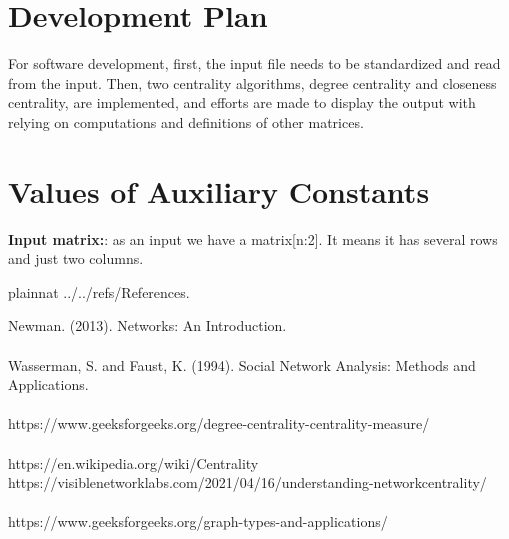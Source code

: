 \documentclass[12pt]{article}
\begin{document}



\section{Development Plan}


For software development, first, the input file needs to be standardized and read from the input. Then, two centrality algorithms, degree centrality and closeness centrality, are implemented, and efforts are made to display the output with relying on computations and definitions of other matrices.

\section{Values of Auxiliary Constants}


 \textbf{Input matrix:}: as an input we have a matrix[n:2]. It means it has several rows and just two columns.


\newpage

 {plainnat}
 {../../refs/References}.\newline

Newman. (2013). Networks: An Introduction.\\\\
Wasserman, S. and Faust, K. (1994).
Social Network Analysis: Methods and Applications.\\\\
https://www.geeksforgeeks.org/degree-centrality-centrality-measure/\\\\
https://en.wikipedia.org/wiki/Centrality\\
https://visiblenetworklabs.com/2021/04/16/understanding-networkcentrality/\\\\
https://www.geeksforgeeks.org/graph-types-and-applications/\\\\
\end{document}
